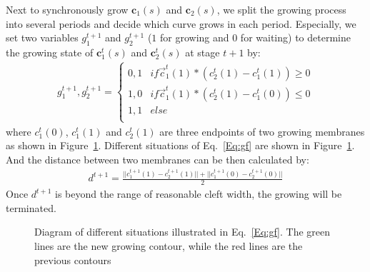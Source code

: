 Next to synchronously grow $\mathbf{c}_1(s)$ and $\mathbf{c}_2(s)$, we split the growing process into several periods and decide which curve grows in each period.
Especially, we set two variables $g_1^{t+1}$ and $g_2^{t+1}$  ($1$ for growing and $0$ for waiting) to determine the growing state of $\mathbf{c}_1^{t}(s)$ and $\mathbf{c}_2^{t}(s)$ at stage $t+1$ by:
\begin{eqnarray}\label{Eq:gf}
g_1^{t+1},g_2^{t+1} = \left\{\begin{array}{cc}
0,1&if \overrightarrow{c}^t_1(1)*(c_2^t(1)-c_1^t(1))\geq 0 \\
1,0&if \overrightarrow{c}^t_1(1)*(c_2^t(1)-c_1^t(0))\leq 0\\
1,1& else\\
\end{array}\right.
\end{eqnarray}
where $c_1^t(0)$, $c_1^t(1)$ and $c_2^t(1)$ are three endpoints of two growing membranes as shown in Figure~\ref{fig:sg}.
Different situations of Eq.~\ref{Eq:gf} are shown in Figure~\ref{fig:sg}.
And the distance between two membranes can be then calculated by:
\begin{eqnarray}\label{Eq:d}
d^{t+1} = \frac{||c_1^{t+1}(1)-c_2^{t+1}(1)||+ ||c_1^{t+1}(0)-c_2^{t+1}(0)||}{2}
\end{eqnarray}
Once $d^{t+1}$ is beyond the range of reasonable cleft width, the growing will be terminated.
\begin{figure}[t]
\begin{minipage}[b]{1.0\linewidth}
  \centering
 \centerline{}
\end{minipage}
\caption{Diagram of different situations illustrated in Eq.~\ref{Eq:gf}.
        The green lines are the new growing contour, while the red lines are the previous contours}
\label{fig:sg}
\end{figure}

